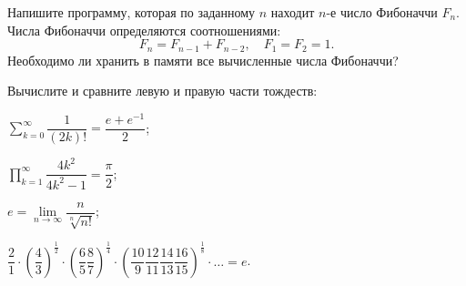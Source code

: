 \ExercisesSection
\begin{exercise}
\item Напишите программу, которая по заданному \(n\) находит \(n\)-е число Фибоначчи \(F_n\). Числа Фибоначчи определяются соотношениями:
\[
F_n = F_{n-1} + F_{n-2},\quad F_1 = F_2 = 1.
\]
Необходимо ли хранить в памяти все вычисленные числа Фибоначчи?


\item Вычислите и сравните левую и правую части тождеств:
\begin{flushleft}
    \begin{enumerate*}[label=\arabic*), itemjoin={\qquad}]
        \item \(\sum\limits_{k=0}^{\infty}\dfrac{1}{(2k)!} = \dfrac{e + e^{-1}}{2}\);
        \item \(\prod\limits_{k=1}^{\infty} \dfrac{4k^2}{4k^2 - 1} = \dfrac{\pi}{2}\);
        \item \(e = \lim\limits_{n\to\infty} \dfrac{n}{\sqrt[n]{n!}}\);
    \end{enumerate*}
    \begin{flushright}
        \begin{enumerate*}[label=\arabic*), itemjoin={;\qquad}, resume]
            \item \(\dfrac{2}{1}\cdot
            \left( \dfrac{4}{3} \right)^{\frac{1}{2}}\cdot
            \left( \dfrac{6}{5}\dfrac{8}{7} \right)^{\frac{1}{4}}\cdot
            \left( \dfrac{10}{9}\dfrac{12}{11}\dfrac{14}{13}\dfrac{16}{15} \right)^{\frac{1}{8}}\cdot
            \ldots = e\).
        \end{enumerate*}
    \end{flushright}
\end{flushleft}
\end{exercise}
